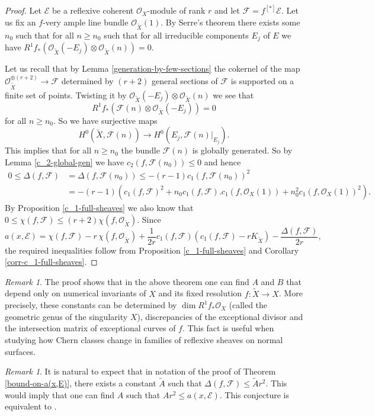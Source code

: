 \documentclass[twoside, 11pt]{article}
\theoremstyle{plain}
\theoremstyle{definition}
\theoremstyle{remark}
\newtheorem{Remark}[Thm]{Remark}
\newcommand{\cE}{{\mathcal E}}
\newcommand{\cF}{{\mathcal F}}
\newcommand{\cO}{{\mathcal O}}
\begin{document}
\begin{proof}
	Let $\cE$ be a reflexive coherent $\cO_X$-module of rank $r$ and let $\cF= f^{[*]}\cE$.
	Let us fix an $f$-very ample line bundle $\cO_{\tilde X} (1)$.
	By Serre's theorem there exists some $n_0$ such that for all $n\ge n_0$ such that for all irreducible components $E_j$ of $E$ we have $R^1f_*(\cO_{\tilde X} (-E_j)\otimes \cO_{\tilde X} (n))=0$.
	
	Let us recall that by Lemma \ref{generation-by-few-sections}
	the cokernel of the map $\cO ^{\oplus (r+2)}_{\tilde X}\to \cF$ determined by  $(r+2)$ general sections of $\cF$
	is supported on a finite set of points. Twisting it by $\cO_{\tilde X} (-E_j)\otimes \cO_{\tilde X} (n)$ we see that 
	$$R^1f_*(\cF (n)\otimes \cO_{\tilde X} (-E_j))=0$$
	for all $n\ge n_0$.
	So we have surjective maps $$H^0(\tilde X , \cF (n))\to H^0( E_j, \cF (n)|_{E_j}).$$
	This implies that for all $n\ge n_0$ the bundle $\cF (n)$ is globally generated.
	So by Lemma \ref{c_2-global-gen} we have $c_2(f, \cF (n_0))\le 0$ and hence
	\begin{align*}
		0\le \Delta (f, \cF)&=\Delta(f, \cF (n_0))\le - (r-1)c_1(f, \cF (n_0))^2\\
		&=
		- (r-1)\left( c_1(f, \cF )^2 +n_0 c_1(f, \cF ).c_1(f, \cO_X(1))+n_0^2 c_1(f, \cO_X(1))^2 \right) .
	\end{align*}
	By Proposition \ref{c_1-full-sheaves} we also know that $0\le \chi (f, \cF)\le  (r+2)  \chi (f, \cO_{\tilde X})$. Since
	$$a (x,  \cE)=\chi (f, \cF)-r\, \chi(f,\cO_{\tilde X})+
	\frac{1}{2r}c_1(f,  \cF)(c_1(f,  \cF)-rK_{\tilde X})-\frac{\Delta (f,  \cF)}{2r},$$
	the required inequalities follow from Proposition \ref{c_1-full-sheaves}  and Corollary \ref{corr-c_1-full-sheaves}.
\end{proof}

\begin{Remark}
	The proof shows that in the above theorem one can find $A$ and $B$ that depend only on  numerical invariants of $X$ and its fixed resolution $f: \tilde X\to X$. More precisely,  these constants can be determined by $\dim R^1f_* \cO_X $ (called the geometric genus of the singularity $X$), discrepancies of the exceptional divisor and the intersection matrix of exceptional curves of $f$. This fact is useful when studying how Chern classes change in families of reflexive sheaves on normal surfaces.
\end{Remark}

\begin{Remark}
	It is natural to expect that in notation of  the proof of Theorem \ref{bound-on-a(x,E)},
	there exists a constant $\tilde A$ such that $\Delta (f, \cF)\le \tilde A r^2$.  This would imply that one can find $A$ such that $A r^2\le  a(x, \cE)$. This conjecture is equivalent to  \cite[Conjecture 8.2]{La0}.
\end{Remark}
\end{document}
